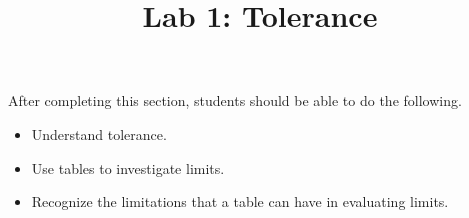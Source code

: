 \documentclass{ximera}
\title{Lab 1: Tolerance}
\begin{document}
\begin{abstract}
\end{abstract}

\maketitle

\begin{sectionOutcomes}

After completing this section, students should be able to do the following.

\begin{itemize}
	\item Understand tolerance.
    \item Use tables to investigate limits.
    \item Recognize the limitations that a table can have in evaluating limits.
\end{itemize}
\end{sectionOutcomes}
\end{document}
